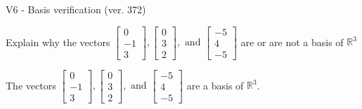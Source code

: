 \begin{exercise}
  \begin{exerciseTitle}V6 - Basis verification (ver. 372)\end{exerciseTitle}
  \begin{exerciseStatement}
    Explain why the vectors \(\left[\begin{array}{r}
0 \\
-1 \\
3
\end{array}\right] , \left[\begin{array}{r}
0 \\
3 \\
2
\end{array}\right] , \text{ and } \left[\begin{array}{r}
-5 \\
4 \\
-5
\end{array}\right]\) are or are not a basis of \(\mathbb{R}^3\)	


  \end{exerciseStatement}
  \begin{exerciseAnswer}
   The vectors \(\left[\begin{array}{r}
0 \\
-1 \\
3
\end{array}\right] , \left[\begin{array}{r}
0 \\
3 \\
2
\end{array}\right] , \text{ and } \left[\begin{array}{r}
-5 \\
4 \\
-5
\end{array}\right]\) 
  	 are  a basis of \(\mathbb{R}^3\).
  


  \end{exerciseAnswer}
\end{exercise}